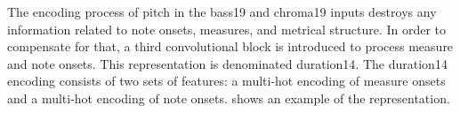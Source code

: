 
The encoding process of pitch in the \gls{bass19} and
\gls{chroma19} inputs destroys any information related to
note onsets, measures, and metrical structure. In order to
compensate for that, a third convolutional block is
introduced to process measure and note onsets. This
representation is denominated \gls{duration14}. The
\gls{duration14} encoding consists of two sets of features:
a multi-hot encoding of measure onsets and a multi-hot
encoding of note onsets.  shows an
example of the representation.


